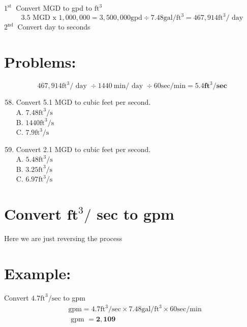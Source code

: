 \documentclass[10pt]{article}
\begin{document}
$1^{\text {st }}$ Convert MGD to gpd to $\mathrm{ft}^{3}$
$$
\text { 3.5 MGD x } 1,000,000=3,500,000 \mathrm{gpd} \div 7.48 \mathrm{gal} / \mathrm{ft}^{3}=467,914 \mathrm{ft}^{3} / \text { day }
$$
$2^{\text {nd }}$ Convert day to seconds

\section{Problems:}
$$
467,914 \mathrm{ft}^{3} / \text { day } \div 1440 \mathrm{~min} / \text { day } \div 60 \mathrm{sec} / \mathrm{min}=5.4 \mathbf{f t}^{3} / \mathbf{s e c}
$$

\begin{enumerate}
  \setcounter{enumi}{57}
  \item Convert 5.1 MGD to cubic feet per second.\\
A. $7.48 \mathrm{ft}^{3} / \mathrm{s}$\\
B. $1440 \mathrm{ft}^{3} / \mathrm{s}$\\
C. $7.9 \mathrm{ft}^{3} / \mathrm{s}$

  \item Convert 2.1 MGD to cubic feet per second.\\
A. $5.48 \mathrm{ft}^{3} / \mathrm{s}$\\
B. $3.25 \mathrm{ft}^{3} / \mathrm{s}$\\
C. $6.97 \mathrm{ft}^{3} / \mathrm{s}$

\end{enumerate}
\section{Convert $\mathbf{f t}^{3} /$ sec to gpm}
Here we are just reversing the process

\section{Example:}
Convert $4.7 \mathrm{ft}^{3} / \mathrm{sec}$ to gpm
$$
\begin{aligned}
&\mathrm{gpm}=4.7 \mathrm{ft}^{3} / \mathrm{sec} \times 7.48 \mathrm{gal} / \mathrm{ft}^{3} \times 60 \mathrm{sec} / \mathrm{min} \\
&\text { gpm }=\mathbf{2 , 1 0 9}
\end{aligned}
$$
\end{document}
